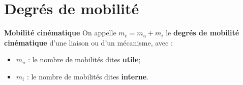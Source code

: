 \def\xxactivite{Cours}
\def\xxauteur{\textsl{Xavier Pessoles}}

\fichefalse
\proftrue
\tdfalse
\courstrue

\def\xxnumchapitre{Chapitre 2 \vspace{.2cm}}
\def\xxchapitre{\hspace{.12cm} Hyperstatisme}

\def\xxcompetences{%
\textsl{%
\textbf{Savoirs et compétences :}\\
\begin{itemize}[label=\ding{112},font=\color{ocre}] 
\item \textit{Mod2.C34} : chaînes de solides;
\item \textit{Mod2.C34} : degré de mobilité du modèle;
\item \textit{Mod2.C34} : degré d’hyperstatisme du modèle;
\item \textit{Mod2.C34.SF1} : déterminer les conditions géométriques associées à l’hyperstatisme;
\item \textit{Mod2.C34} : résoudre le système associé à la fermeture cinématique et en déduire le degré de mobilité et d’hyperstatisme.
\end{itemize}
}}


\def\xxfigures{
\texttt{[image: lola]}\\
\textit{Robot humanoïde Lola}

\vspace{.5cm}

\texttt{[image: simu]}\\
\textit{Simulateur de vol Lockheed Martin}
}%


\vspace{2cm}
\pagestyle{fancy}
\thispagestyle{plain}



	\section{Degrés de mobilité}

	
\begin{defi}\small{\textbf{\textsf{Mobilité cinématique}}}
On appelle $m_c=m_u+m_i$ le \textbf{degrés de mobilité cinématique} d'une liaison ou d'un mécanisme, avec :
\begin{itemize}
\item $m_u$ : le nombre de mobilités dites \textbf{utile};
\item $m_i$ : le nombre de mobilités dites \textbf{interne}.
\end{itemize}
\end{defi}

